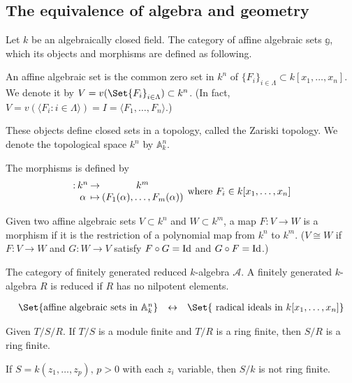 \subsection{The equivalence of algebra and geometry}

\begin{definition}
  Let $k$ be an algebraically closed field.
  The category of affine algebraic sets $\mathbb{g}$, which its objects and morphisms are defined as following.

  An affine algebraic set is the common zero set in $k^n$ of $\{ F_i \}_{i \in \Lambda} \subset k[x_1, \dots, x_n]$.
  We denote it by $V = v(\Set{F_i}_{i \in \Lambda}) \subset k^n$. (In fact, $V = v(\langle F_i : i \in \Lambda \rangle)
  = I = \langle F_1, \dots, F_n \rangle$.)

  These objects define closed sets in a topology, called the Zariski topology. We denote the
  topological space $k^n$ by $\mathbb{A}^n_k$.

  The morphisms is defined by
  \[ \deffunc{}{k^n}{k^m}{\alpha}{(F_1(\alpha), \dots, F_m(\alpha))} \text{ where } F_i \in k[x_1, \dots, x_n] \]
  
  Given two affine algebraic sets $V \subset k^n$ and $W \subset k^m$, a map $F: V \to W$ is a morphism
  if it is the restriction of a polynomial map from $k^n$ to $k^m$.
  ($V \cong W$ if $F: V \to W$ and $G : W \to V$ satisfy $F \circ G = {\rm Id}$ and $G \circ F = {\rm Id}$.)
\end{definition}



\begin{definition}
  The category of finitely generated reduced $k$-algebra $\mathcal{A}$.
  A finitely generated $k$-algebra $R$ is reduced if $R$ has no nilpotent elements.

  \[
    \begin{array}{ccc}
      \Set{ \text{affine algebraic sets in } \mathbb{A}^n_k } & \leftrightarrow & \Set{ \text{ radical ideals in } k[x_1, \dots, x_n]}
    \end{array}
  \]
\end{definition}

\begin{lemma}
  Given $T/S/R$. If $T/S$ is a module finite and $T/R$ is a ring finite, then $S/R$ is a ring finite.
\end{lemma}

\begin{lemma}
  If $S = k(z_1, \dots, z_p), \, p > 0$ with each $z_i$ variable, then $S/k$ is not ring finite.
\end{lemma}


